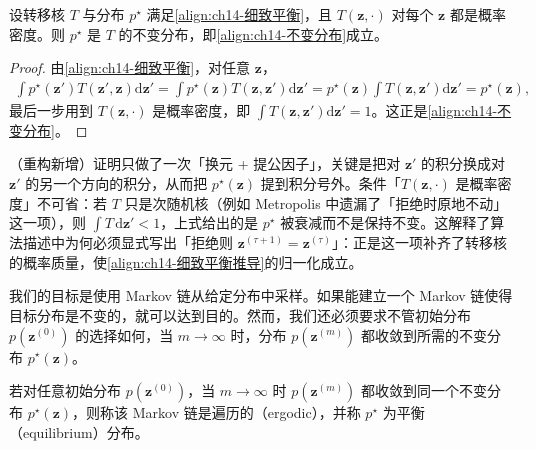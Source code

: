 \documentclass[../../main.tex]{subfiles}
\begin{document}
\begin{proposition}[详细平衡蕴含不变性]\label{proposition:ch14-细致平衡蕴含不变}
设转移核 $T$ 与分布 $p^{\star}$ 满足\eqref{align:ch14-细致平衡}，且 $T\!\left(\bm{z},\cdot\right)$ 对每个 $\bm{z}$ 都是概率密度。则 $p^{\star}$ 是 $T$ 的不变分布，即\eqref{align:ch14-不变分布}成立。
\end{proposition}

\begin{proof}
由\eqref{align:ch14-细致平衡}，对任意 $\bm{z}$，
\begin{align*}
\int p^{\star}\!\left(\bm{z}'\right)T\!\left(\bm{z}',\bm{z}\right)\mathrm{d}\bm{z}'=\int p^{\star}(\bm{z})T\!\left(\bm{z},\bm{z}'\right)\mathrm{d}\bm{z}'=p^{\star}(\bm{z})\int T\!\left(\bm{z},\bm{z}'\right)\mathrm{d}\bm{z}'=p^{\star}(\bm{z}),
\end{align*}
最后一步用到 $T\!\left(\bm{z},\cdot\right)$ 是概率密度，即 $\int T\!\left(\bm{z},\bm{z}'\right)\mathrm{d}\bm{z}'=1$。这正是\eqref{align:ch14-不变分布}。
\end{proof}

\begin{remark}（重构新增）证明只做了一次「换元 + 提公因子」，关键是把对 $\bm{z}'$ 的积分换成对 $\bm{z}'$ 的另一个方向的积分，从而把 $p^{\star}(\bm{z})$ 提到积分号外。条件「$T\!\left(\bm{z},\cdot\right)$ 是概率密度」不可省：若 $T$ 只是次随机核（例如 Metropolis 中遗漏了「拒绝时原地不动」这一项），则 $\int T\,\mathrm{d}\bm{z}'<1$，上式给出的是 $p^{\star}$ 被衰减而不是保持不变。这解释了算法描述中为何必须显式写出「拒绝则 $\bm{z}^{(\tau+1)}=\bm{z}^{(\tau)}$」：正是这一项补齐了转移核的概率质量，使\eqref{align:ch14-细致平衡推导}的归一化成立。
\end{remark}

我们的目标是使用 Markov 链从给定分布中采样。如果能建立一个 Markov 链使得目标分布是不变的，就可以达到目的。然而，我们还必须要求不管初始分布 $p\!\left(\bm{z}^{(0)}\right)$ 的选择如何，当 $m\rightarrow\infty$ 时，分布 $p\!\left(\bm{z}^{(m)}\right)$ 都收敛到所需的不变分布 $p^{\star}(\bm{z})$。

\begin{definition}[遍历性]\label{definition:ch14-遍历性}
若对任意初始分布 $p\!\left(\bm{z}^{(0)}\right)$，当 $m\rightarrow\infty$ 时 $p\!\left(\bm{z}^{(m)}\right)$ 都收敛到同一个不变分布 $p^{\star}(\bm{z})$，则称该 Markov 链是遍历的（ergodic），并称 $p^{\star}$ 为平衡（equilibrium）分布。
\end{definition}
\end{document}
